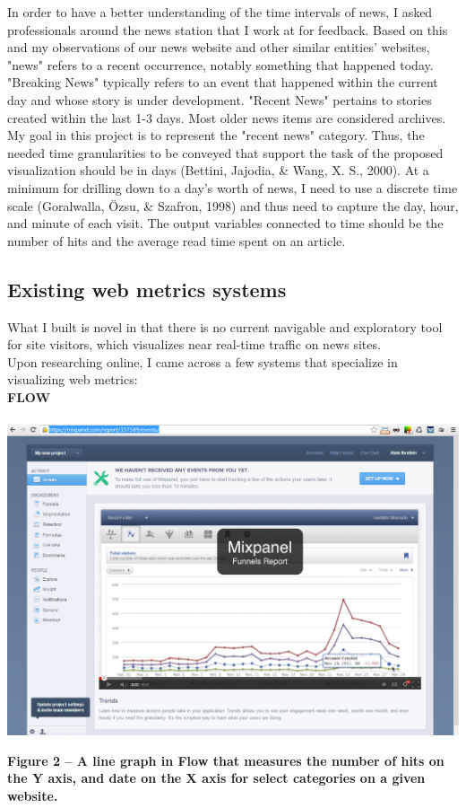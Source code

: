 \documentclass[12pt]{article}
\begin{document}
In order to have a better understanding of the time intervals of news, I asked professionals around the news station that I work at for feedback. Based on this and my observations of our news website and other similar entities' websites, "news" refers to a recent occurrence, notably something that happened today. "Breaking News" typically refers to an event that happened within the current day and whose story is under development. "Recent News" pertains to stories created within the last 1-3 days. Most older news items are considered archives. \\
 My goal in this project is to represent the "recent news" category. Thus, the needed time granularities to be conveyed that support the task of the proposed visualization should be in days (Bettini, Jajodia, \& Wang, X. S., 2000). At a minimum for drilling down to a day's worth of news, I need to use a discrete time scale (Goralwalla, \"{O}zsu, \& Szafron, 1998) and thus need to capture the day, hour, and minute of each visit. The output variables connected to time should be the number of hits and the average read time spent on an article.

\newpage

\subsection{Existing web metrics systems}
What I built is novel in that there is no current navigable and exploratory tool for site visitors, which visualizes near real-time traffic on news sites. \\
Upon researching online, I came across a few systems that specialize in visualizing web metrics: \\

\noindent\textbf{FLOW} \\ \\
\noindent\includegraphics[scale=0.45]{img/flow}
\begin{singlespace}
\noindent\textbf{Figure 2 -- A line graph in Flow that measures the number of hits on the Y axis, and date on the X axis for select categories on a given website.} \\
\end{singlespace}
\end{document}
